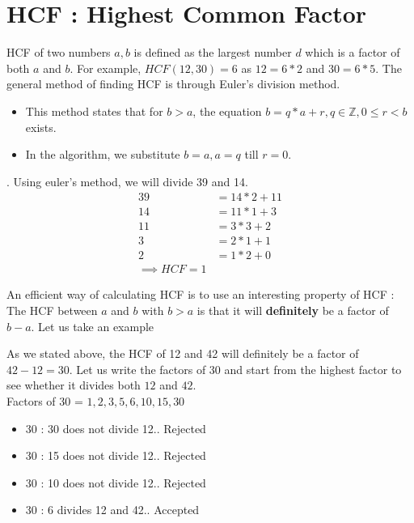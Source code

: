 \section{HCF : Highest Common Factor}
HCF of two numbers $a,b$ is defined as the largest number $d$ which is a factor of both $a$ and $b$. For example, $HCF(12,30) = 6$ as $12 = 6*2$ and $30 = 6 * 5$. The general method of finding HCF is through Euler's division method. \\ 
\begin{itemize}
    \item This method states that for $b > a$, the equation $b = q * a + r, q \in{\mathbb{Z}}, 0 \leq r < b$ exists.

    \item In the algorithm, we substitute $b = a, a = q$ till $r = 0$. 
\end{itemize}
 

.
Using euler's method, we will divide 39 and 14. 
\begin{align*}
    39 &= 14 * 2 + 11 \tag{$b = 39, a = 14, r = 11$. Put $b = a, a = r$} \\
    14 &= 11 * 1 + 3 \tag{$b = 14, a = 11, r = 3$. Put $b = a, a = r$} \\
    11 &= 3 * 3 + 2 \tag{$b = 11, a = 3, r = 2$. Put $b = a, a = r$} \\
    3 &= 2 * 1 + 1 \tag{$b = 3, a = 2, r = 1$. Put $b = a, a = r$} \\
    2 &= 1 * 2 + 0 \tag{$b = 2, a = 1, r = 0$. Terminate} \\
    \implies HCF = 1
\end{align*}


An efficient way of calculating HCF is to use an interesting property of HCF : The HCF between $a$ and $b$ with $b > a$ is that it will \textbf{definitely} be a factor of $b - a$. Let us take an example 

As we stated above, the HCF of 12 and 42 will definitely be a factor of $42 - 12 = 30$. Let us write the factors of 30 and start from the highest factor to see whether it divides both $12$ and $42$. \\

Factors of 30 = $1,2,3,5,6,10,15,30$
\begin{itemize}
    \item 30 : 30 does not divide 12.. Rejected
    \item 30 : 15 does not divide 12.. Rejected
    \item 30 : 10 does not divide 12.. Rejected
    \item 30 : 6 divides 12 and 42.. Accepted
\end{itemize}

